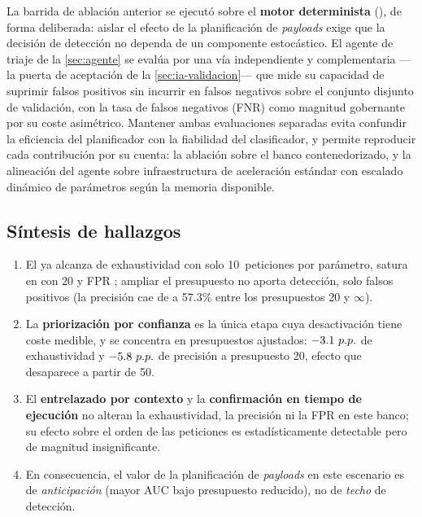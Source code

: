 La barrida de ablación anterior se ejecutó sobre el \textbf{motor determinista}
(), de forma deliberada: aislar el efecto de la planificación de
\emph{payloads} exige que la decisión de detección no dependa de un componente
estocástico. El agente de triaje de la \cref{sec:agente} se evalúa por una vía
independiente y complementaria ---la puerta de aceptación de la
\cref{sec:ia-validacion}--- que mide su capacidad de suprimir falsos positivos
sin incurrir en falsos negativos sobre el conjunto disjunto de validación, con
la tasa de falsos negativos (FNR) como magnitud gobernante por su coste
asimétrico. Mantener ambas evaluaciones separadas evita confundir la eficiencia
del planificador con la fiabilidad del clasificador, y permite reproducir cada
contribución por su cuenta: la ablación sobre el banco contenedorizado, y la
alineación del agente sobre infraestructura de aceleración estándar con escalado
dinámico de parámetros según la memoria disponible.

\subsection{Síntesis de hallazgos}
\label{sec:res-sintesis}

\begin{enumerate}
  \item El   ya alcanza \ValorRecallBudgetDiez{}
  de exhaustividad con solo \num{10}~peticiones por parámetro, satura en
  \ValorRecallTecho{} con \num{20} y FPR \ValorFPRBaseline{}; ampliar el
  presupuesto no aporta detección, solo falsos positivos (la precisión cae de
  \ValorPrecisionBaseline{} a \num{57.3}\% entre los presupuestos \num{20} y
  $\infty$).
  \item La \textbf{priorización por confianza} es la única etapa cuya
  desactivación tiene coste medible, y se concentra en presupuestos
  ajustados: $-\num{3.1}~p.p.{}$ de exhaustividad y
  $-\num{5.8}~p.p.{}$ de precisión a presupuesto \num{20}, efecto
  que desaparece a partir de \num{50}.
  \item El \textbf{entrelazado por contexto} y la \textbf{confirmación en
  tiempo de ejecución} no alteran la exhaustividad, la precisión ni la FPR en
  este banco; su efecto sobre el orden de las peticiones es estadísticamente
  detectable pero de magnitud insignificante.
  \item En consecuencia, el valor de la planificación de \emph{payloads} en
  este escenario es de \emph{anticipación} (mayor AUC bajo presupuesto
  reducido), no de \emph{techo} de detección.
\end{enumerate}
